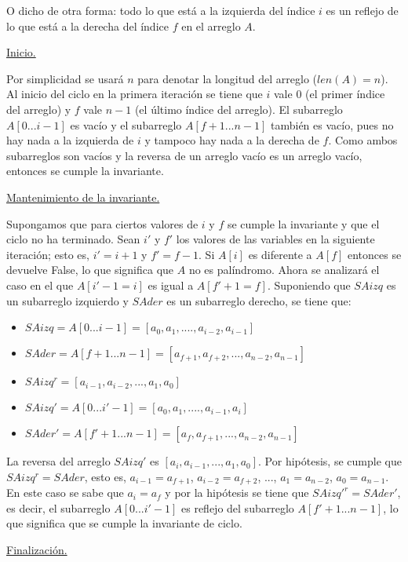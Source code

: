 \documentclass{article}
\begin{document}
O dicho de otra forma: todo lo que está a la izquierda del índice $i$ es un reflejo de lo que está a la derecha del índice $f$ en el arreglo $A$.

\underline{Inicio.}

Por simplicidad se usará $n$ para denotar la longitud del arreglo ($len(A) = n$). Al inicio del ciclo en la primera iteración se tiene que $i$ vale 0 (el primer índice del arreglo) y $f$ vale $n-1$ (el último índice del arreglo). El subarreglo $A[0 ... i-1]$ es vacío y el subarreglo $A[f+1 ... n-1]$ también es vacío, pues no hay nada a la izquierda de $i$ y tampoco hay nada a la derecha de $f$. Como ambos subarreglos son vacíos y la reversa de un arreglo vacío es un arreglo vacío, entonces se cumple la invariante.

\underline{Mantenimiento de la invariante.}

Supongamos que para ciertos valores de $i$ y $f$ se cumple la invariante y que el ciclo no ha terminado. Sean $i'$ y $f'$ los valores de las variables en la siguiente iteración; esto es, $i' = i+1$ y $f' = f-1$. Si $A[i]$ es diferente a $A[f]$ entonces se devuelve False, lo que significa que $A$ no es palíndromo. Ahora se analizará el caso en el que $A[i'-1 = i]$ es igual a $A[f'+1=f]$. Suponiendo que $SAizq$ es un subarreglo izquierdo y $SAder$ es un subarreglo derecho, se tiene que:

\begin{itemize}
\item $SAizq = A[0...i-1] = [a_0, a_1, ...., a_{i-2}, a_{i-1}]$
\item $SAder = A[f+1...n-1] = [a_{f+1}, a_{f+2}, ..., a_{n-2}, a_{n-1}]$
\item $SAizq^r = [a_{i-1}, a_{i-2}, ..., a_1, a_0]$
\item $SAizq' = A[0...i'-1] = [a_0, a_1, ...., a_{i-1}, a_{i}]$
\item $SAder' = A[f'+1...n-1] = [a_{f}, a_{f+1}, ..., a_{n-2}, a_{n-1}]$
\end{itemize}

La reversa del arreglo $SAizq'$ es $[a_{i}, a_{i-1}, ..., a_1, a_0]$. Por hipótesis, se cumple que $SAizq^r = SAder$, esto es, $a_{i-1} = a_{f+1}$, $a_{i-2} = a_{f+2}$, ..., $a_{1} = a_{n-2}$, $a_{0} = a_{n-1}$. En este caso se sabe que $a_i = a_f$ y por la hipótesis se tiene que $SAizq'^r = SAder'$, es decir, el subarreglo $A[0...i'-1]$ es reflejo del subarreglo $A[f'+1...n-1]$, lo que significa que se cumple la invariante de ciclo.

\underline{Finalización.}
\end{document}
